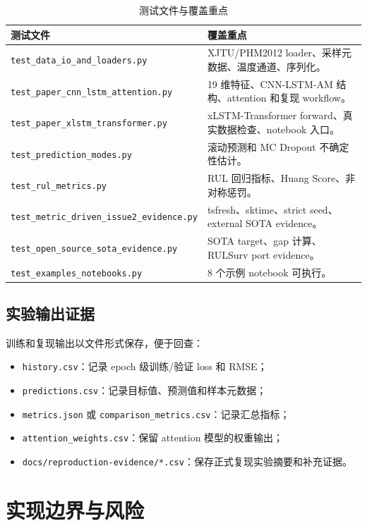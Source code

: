 \documentclass[UTF8,a4paper,12pt]{ctexart}
\newcommand{\code}[1]{\texttt{#1}}
\begin{document}
\begin{table}[H]
\centering
\caption{测试文件与覆盖重点}
\begin{tabularx}{\textwidth}{p{5.2cm}Y}
\toprule
测试文件 & 覆盖重点 \\
\midrule
\code{test\_data\_io\_and\_loaders.py} & XJTU/PHM2012 loader、采样元数据、温度通道、序列化。 \\
\code{test\_paper\_cnn\_lstm\_attention.py} & 19 维特征、CNN-LSTM-AM 结构、attention 和复现 workflow。 \\
\code{test\_paper\_xlstm\_transformer.py} & xLSTM-Transformer forward、真实数据检查、notebook 入口。 \\
\code{test\_prediction\_modes.py} & 滚动预测和 MC Dropout 不确定性估计。 \\
\code{test\_rul\_metrics.py} & RUL 回归指标、Huang Score、非对称惩罚。 \\
\code{test\_metric\_driven\_issue2\_evidence.py} & tsfresh、sktime、strict seed、external SOTA evidence。 \\
\code{test\_open\_source\_sota\_evidence.py} & SOTA target、gap 计算、RULSurv port evidence。 \\
\code{test\_examples\_notebooks.py} & 8 个示例 notebook 可执行。 \\
\bottomrule
\end{tabularx}
\end{table}

\subsection{实验输出证据}

训练和复现输出以文件形式保存，便于回查：

\begin{itemize}
  \item \code{history.csv}：记录 epoch 级训练/验证 loss 和 RMSE；
  \item \code{predictions.csv}：记录目标值、预测值和样本元数据；
  \item \code{metrics.json} 或 \code{comparison\_metrics.csv}：记录汇总指标；
  \item \code{attention\_weights.csv}：保留 attention 模型的权重输出；
  \item \code{docs/reproduction-evidence/*.csv}：保存正式复现实验摘要和补充证据。
\end{itemize}

\section{实现边界与风险}
\end{document}

